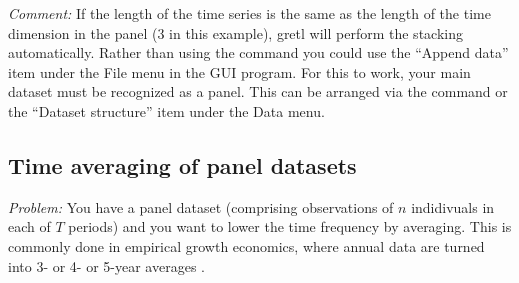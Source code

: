 \emph{Comment:} If the length of the time series is the same as the
length of the time dimension in the panel (3 in this example), gretl
will perform the stacking automatically.  Rather than using the
 command you could use the ``Append data'' item under
the \textsf{File} menu in the GUI program.  For this to work, your
main dataset must be recognized as a panel.  This can be arranged via
the  command or the ``Dataset structure'' item under
the \textsf{Data} menu.

\subsection{Time averaging of panel datasets}

\emph{Problem:} You have a panel dataset (comprising observations of
$n$ indidivuals in each of $T$ periods) and you want to lower the time
frequency by averaging. This is commonly done in empirical growth
economics, where annual data are turned into 3- or 4- or 5-year
averages \citep[see for example][]{Islam1995}.

